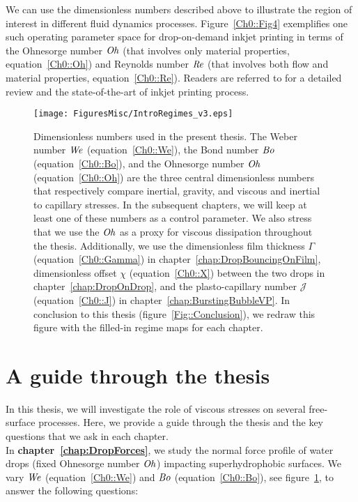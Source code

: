 We can use the dimensionless numbers described above to illustrate the region of interest in different fluid dynamics processes. Figure~\ref{Ch0::Fig4} exemplifies one such operating parameter space for drop-on-demand inkjet printing in terms of the Ohnesorge number $\mathit{Oh}$ (that involves only material properties, equation~\eqref{Ch0::Oh}) and Reynolds number $\mathit{Re}$ (that involves both flow and material properties, equation~\eqref{Ch0::Re}). Readers are referred to \citet{lohse2022fundamental} for a detailed review and the state-of-the-art of inkjet printing process.

\begin{sidewaysfigure}
	\centering
	\texttt{[image: FiguresMisc/IntroRegimes\_v3.eps]}	
	\caption{Dimensionless numbers used in the present thesis. The Weber number $\mathit{We}$ (equation~\eqref{Ch0::We}), the Bond number $\mathit{Bo}$ (equation~\eqref{Ch0::Bo}), and the Ohnesorge number $\mathit{Oh}$ (equation~\eqref{Ch0::Oh}) are the three central dimensionless numbers that respectively compare inertial, gravity, and viscous and inertial to capillary stresses. In the subsequent chapters, we will keep at least one of these numbers as a control parameter. We also stress that we use the $\mathit{Oh}$ as a proxy for viscous dissipation throughout the thesis. Additionally, we use the dimensionless film thickness $\Gamma$ (equation~\eqref{Ch0::Gamma}) in chapter~\ref{chap:DropBouncingOnFilm}, dimensionless offset $\chi$ (equation~\eqref{Ch0::X}) between the two drops in chapter~\ref{chap:DropOnDrop}, and the plasto-capillary number $\mathcal{J}$ (equation~\eqref{Ch0::J}) in chapter~\ref{chap:BurstingBubbleVP}. In conclusion to this thesis (figure~\ref{Fig::Conclusion}), we redraw this figure with the filled-in regime maps for each chapter.}
	\label{Fig::IntroRegimeMap}
\end{sidewaysfigure}

\section*{A guide through the thesis}

In this thesis, we will investigate the role of viscous stresses on several free-surface processes. Here, we provide a guide through the thesis and the key questions that we ask in each chapter.\\

In \textbf{chapter~\ref{chap:DropForces}}, we study the normal force profile of water drops (fixed Ohnesorge number $\mathit{Oh}$) impacting superhydrophobic surfaces. We vary $\mathit{We}$ (equation~\eqref{Ch0::We}) and $\mathit{Bo}$ (equation~\eqref{Ch0::Bo}), see figure~\ref{Fig::IntroRegimeMap}, to answer the following questions:\vspace{1.25mm}


